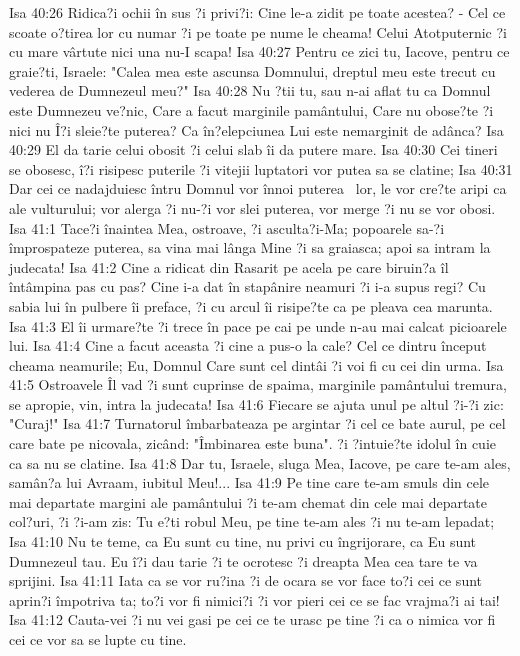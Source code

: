 Isa 40:26  Ridica?i ochii în sus ?i privi?i: Cine le-a zidit pe toate acestea? - Cel ce scoate o?tirea lor cu numar ?i pe toate pe nume le cheama! Celui Atotputernic ?i cu mare vârtute nici una nu-I scapa!
Isa 40:27  Pentru ce zici tu, Iacove, pentru ce graie?ti, Israele: "Calea mea este ascunsa Domnului, dreptul meu este trecut cu vederea de Dumnezeul meu?"
Isa 40:28  Nu ?tii tu, sau n-ai aflat tu ca Domnul este Dumnezeu ve?nic, Care a facut marginile pamântului, Care nu obose?te ?i nici nu Î?i sleie?te puterea? Ca în?elepciunea Lui este nemarginit de adânca?
Isa 40:29  El da tarie celui obosit ?i celui slab îi da putere mare.
Isa 40:30  Cei tineri se obosesc, î?i risipesc puterile ?i vitejii luptatori vor putea sa se clatine;
Isa 40:31  Dar cei ce nadajduiesc întru Domnul vor înnoi puterea  lor, le vor cre?te aripi ca ale vulturului; vor alerga ?i nu-?i vor slei puterea, vor merge ?i nu se vor obosi.
Isa 41:1  Tace?i înaintea Mea, ostroave, ?i asculta?i-Ma; popoarele sa-?i împrospateze puterea, sa vina mai lânga Mine ?i sa graiasca; apoi sa intram la judecata!
Isa 41:2  Cine a ridicat din Rasarit pe acela pe care biruin?a îl întâmpina pas cu pas? Cine i-a dat în stapânire neamuri ?i i-a supus regi? Cu sabia lui în pulbere îi preface, ?i cu arcul îi risipe?te ca pe pleava cea marunta.
Isa 41:3  El îi urmare?te ?i trece în pace pe cai pe unde n-au mai calcat picioarele lui.
Isa 41:4  Cine a facut aceasta ?i cine a pus-o la cale? Cel ce dintru început cheama neamurile; Eu, Domnul Care sunt cel dintâi ?i voi fi cu cei din urma.
Isa 41:5  Ostroavele Îl vad ?i sunt cuprinse de spaima, marginile pamântului tremura, se apropie, vin, intra la judecata!
Isa 41:6  Fiecare se ajuta unul pe altul ?i-?i zic: "Curaj!"
Isa 41:7  Turnatorul îmbarbateaza pe argintar ?i cel ce bate aurul, pe cel care bate pe nicovala, zicând: "Îmbinarea este buna". ?i ?intuie?te idolul în cuie ca sa nu se clatine.
Isa 41:8  Dar tu, Israele, sluga Mea, Iacove, pe care te-am ales, samân?a lui Avraam, iubitul Meu!...
Isa 41:9  Pe tine care te-am smuls din cele mai departate margini ale pamântului ?i te-am chemat din cele mai departate col?uri, ?i ?i-am zis: Tu e?ti robul Meu, pe tine te-am ales ?i nu te-am lepadat;
Isa 41:10  Nu te teme, ca Eu sunt cu tine, nu privi cu îngrijorare, ca Eu sunt Dumnezeul tau. Eu î?i dau tarie ?i te ocrotesc ?i dreapta Mea cea tare te va sprijini.
Isa 41:11  Iata ca se vor ru?ina ?i de ocara se vor face to?i cei ce sunt aprin?i împotriva ta; to?i vor fi nimici?i ?i vor pieri cei ce se fac vrajma?i ai tai!
Isa 41:12  Cauta-vei ?i nu vei gasi pe cei ce te urasc pe tine ?i ca o nimica vor fi cei ce vor sa se lupte cu tine.
